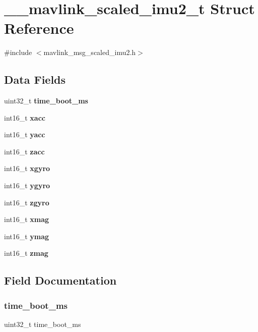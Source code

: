 \section{\+\_\+\+\_\+mavlink\+\_\+scaled\+\_\+imu2\+\_\+t Struct Reference}
\label{struct____mavlink__scaled__imu2__t}


{\ttfamily \#include $<$mavlink\+\_\+msg\+\_\+scaled\+\_\+imu2.\+h$>$}

\subsection*{Data Fields}
\begin{DoxyCompactItemize}
\item 
uint32\+\_\+t \textbf{ time\+\_\+boot\+\_\+ms}
\item 
int16\+\_\+t \textbf{ xacc}
\item 
int16\+\_\+t \textbf{ yacc}
\item 
int16\+\_\+t \textbf{ zacc}
\item 
int16\+\_\+t \textbf{ xgyro}
\item 
int16\+\_\+t \textbf{ ygyro}
\item 
int16\+\_\+t \textbf{ zgyro}
\item 
int16\+\_\+t \textbf{ xmag}
\item 
int16\+\_\+t \textbf{ ymag}
\item 
int16\+\_\+t \textbf{ zmag}
\end{DoxyCompactItemize}


\subsection{Field Documentation}
\mbox{\label{struct____mavlink__scaled__imu2__t_ad4e96ee46e36270d1ab66060e46f8c79}} 
\subsubsection{time\+\_\+boot\+\_\+ms}
{\footnotesize\ttfamily uint32\+\_\+t time\+\_\+boot\+\_\+ms}

\mbox{\label{struct____mavlink__scaled__imu2__t_a962ef46758affd4dcec9a67cb11ed051}} 
